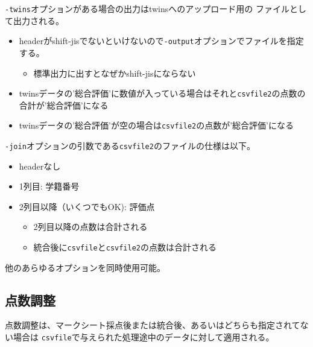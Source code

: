 \texttt{-twins}オプションがある場合の出力はtwinsへのアップロード用の
ファイルとして出力される。

\begin{itemize}
\item headerがshift-jisでないといけないので\texttt{-output}オプションでファイルを指定する。

\begin{itemize}
\item 標準出力に出すとなぜかshift-jisにならない\frownie 

\end{itemize}

\item twinsデータの'総合評価'に数値が入っている場合はそれと\texttt{csvfile2}の点数の合計が'総合評価'になる

\item twinsデータの'総合評価'が空の場合は\texttt{csvfile2}の点数が'総合評価'になる

\end{itemize}

\texttt{-join}オプションの引数である\texttt{csvfile2}のファイルの仕様は以下。

\begin{itemize}
\item headerなし

\item 1列目: 学籍番号

\item 2列目以降（いくつでもOK): 評価点

\begin{itemize}
\item 2列目以降の点数は合計される

\item 統合後に\texttt{csvfile}と\texttt{csvfile2}の点数は合計される

\end{itemize}

\end{itemize}

他のあらゆるオプションを同時使用可能。

\subsection{点数調整}
\label{点数調整}

点数調整は、マークシート採点後または統合後、あるいはどちらも指定されてない場合は
\texttt{csvfile}で与えられた処理途中のデータに対して適用される。

